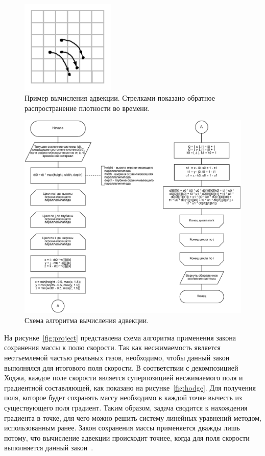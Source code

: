 \begin{figure}[H]
	\centering
	\includegraphics[width=0.4\textwidth,page=1]{assets/img/advect.png}
	\caption{Пример вычисления адвекции. Стрелками показано обратное распространение плотности во времени.}
	\label{fig:advect_idea}
\end{figure}

\begin{figure}[H]
	\centering
	\includegraphics[width=1.0\textwidth,page=1]{assets/img/advect.pdf}
	\caption{Схема алгоритма вычисления адвекции.}
	\label{fig:advect}
\end{figure}

На рисунке~\ref{fig:project} представлена схема алгоритма применения закона сохранения массы к полю скорости. Так как несжимаемость является неотъемлемой частью реальных газов, необходимо, чтобы данный закон выполнялся для итогового поля скорости. В соответствии с декомпозицией Ходжа, каждое поле скорости является суперпозицией несжимаемого поля и градиентной составляющей, как показано на рисунке~\ref{fig:hodge}. Для получения поля, которое будет сохранять массу необходимо в каждой точке вычесть из существующего поля градиент. Таким образом, задача сводится к нахождения градиента в точке, для чего можно решить систему линейных уравнений методом, использованным ранее. Закон сохранения массы применяется дважды лишь потому, что вычисление адвекции происходит точнее, когда для поля скорости выполняется данный закон~\cite{stam}.

